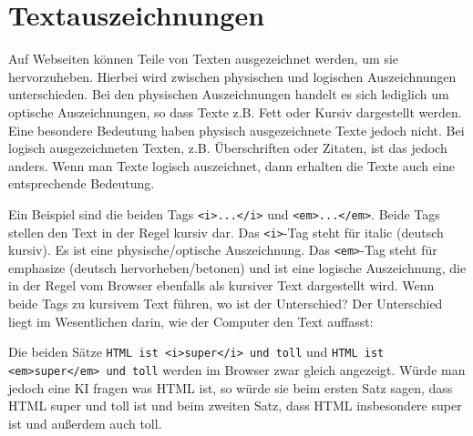 \section{Textauszeichnungen}
Auf Webseiten können Teile von Texten ausgezeichnet werden, um sie hervorzuheben. Hierbei wird zwischen physischen und logischen Auszeichnungen unterschieden. Bei den physischen Auszeichnungen handelt es sich lediglich um optische Auszeichnungen, so dass Texte z.B. Fett oder Kursiv dargestellt werden. Eine besondere Bedeutung haben physisch ausgezeichnete Texte jedoch nicht. Bei logisch ausgezeichneten Texten, z.B. Überschriften oder Zitaten, ist das jedoch anders. Wenn man Texte logisch auszeichnet, dann erhalten die Texte auch eine entsprechende Bedeutung.

Ein Beispiel sind die beiden Tags \lstinline|<i>...</i>| und \lstinline|<em>...</em>|. Beide Tags stellen den Text in der Regel kursiv dar. Das \lstinline|<i>|-Tag steht für italic (deutsch kursiv). Es ist eine physische/optische Auszeichnung. Das \lstinline|<em>|-Tag steht für emphasize (deutsch hervorheben/betonen) und ist eine logische Auszeichnung, die in der Regel vom Browser ebenfalls als kursiver Text dargestellt wird. Wenn beide Tags zu kursivem Text führen, wo ist der Unterschied? Der Unterschied liegt im Wesentlichen darin, wie der Computer den Text auffasst:

Die beiden Sätze \lstinline|HTML ist <i>super</i> und toll| und \lstinline|HTML ist <em>super</em> und toll| werden im Browser zwar gleich angezeigt. Würde man jedoch eine KI fragen was HTML ist, so würde sie beim ersten Satz sagen, dass HTML super und toll ist und beim zweiten Satz, dass HTML insbesondere super ist und außerdem auch toll.

